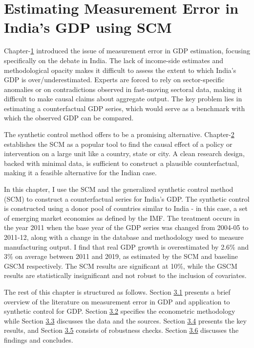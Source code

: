 \documentclass[12pt,nobind, a4paper]{reedthesis}
\begin{document}
 \hypertarget{ch3}{%
 \chapter{Estimating Measurement Error in India's GDP using SCM}\label{ch3}}

 Chapter-\protect\hyperlink{ch1}{1} introduced the issue of measurement error in GDP estimation, focusing specifically on the debate in India. The lack of income-side estimates and methodological opacity makes it difficult to assess the extent to which India's GDP is over/underestimated. Experts are forced to rely on sector-specific anomalies or on contradictions observed in fast-moving sectoral data, making it difficult to make causal claims about aggregate output. The key problem lies in estimating a counterfactual GDP series, which would serve as a benchmark with which the observed GDP can be compared.
 \linebreak

 The synthetic control method offers to be a promising alternative. Chapter-\protect\hyperlink{ch2}{2} establishes the SCM as a popular tool to find the causal effect of a policy or intervention on a large unit like a country, state or city. A clean research design, backed with minimal data, is sufficient to construct a plausible counterfactual, making it a feasible alternative for the Indian case.
 \linebreak

 In this chapter, I use the SCM and the generalized synthetic control method (SCM) to construct a counterfactual series for India's GDP. The synthetic control is constructed using a donor pool of countries similar to India - in this case, a set of emerging market economies as defined by the IMF. The treatment occurs in the year 2011 when the base year of the GDP series was changed from 2004-05 to 2011-12, along with a change in the database and methodology used to measure manufacturing output. I find that real GDP growth is overestimated by 2.6\% and 3\% on average between 2011 and 2019, as estimated by the SCM and baseline GSCM respectively. The SCM results are significant at 10\%, while the GSCM results are statistically insignificant and not robust to the inclusion of covariates.
 \linebreak

 The rest of this chapter is structured as follows. Section \protect\hyperlink{lit}{3.1} presents a brief overview of the literature on measurement error in GDP and application to synthetic control for GDP. Section \protect\hyperlink{ec}{3.2} specifies the econometric methodology while Section \protect\hyperlink{dat}{3.3} discusses the data and the sources. Section \protect\hyperlink{res}{3.4} presents the key results, and Section \protect\hyperlink{rob}{3.5} consists of robustness checks. Section \protect\hyperlink{conc3}{3.6} discusses the findings and concludes.
\end{document}
